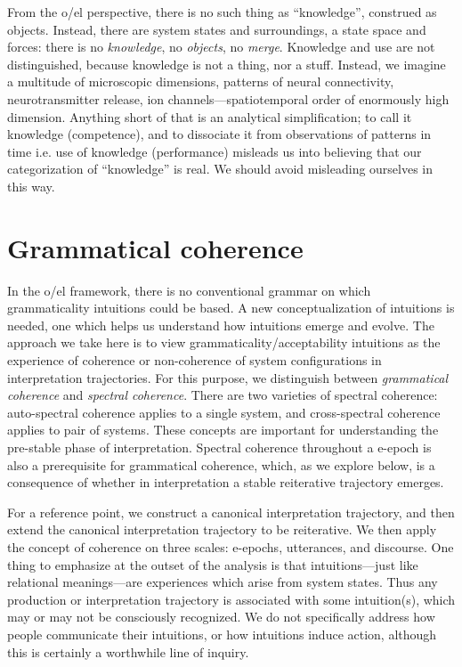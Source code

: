   From the o/el perspective, there is no such thing as “knowledge”, construed as objects. Instead, there are system states and surroundings, a state space and forces: there is no \textit{knowledge}, no \textit{objects}, no \textit{merge}. Knowledge and use are not distinguished, because knowledge is not a thing, nor a stuff. Instead, we imagine a multitude of microscopic dimensions, patterns of neural connectivity, neurotransmitter release, ion channels—spatiotemporal order of enormously high dimension. Anything short of that is an analytical simplification; to call it knowledge (competence), and to dissociate it from observations of patterns in time i.e. use of knowledge (performance) misleads us into believing that our categorization of “knowledge” is real. We should avoid misleading ourselves in this way.

\section{Grammatical coherence}

In the o/el framework, there is no conventional grammar on which grammaticality intuitions could be based. A new conceptualization of intuitions is needed, one which helps us understand how intuitions emerge and evolve. The approach we take here is to view grammaticality/acceptability intuitions as the experience of coherence or non-coherence of system configurations in interpretation trajectories. For this purpose, we distinguish between \textit{grammatical coherence} and \textit{spectral coherence}. There are two varieties of spectral coherence: auto-spectral coherence applies to a single system, and cross-spectral coherence applies to pair of systems. These concepts are important for understanding the pre-stable phase of interpretation. Spectral coherence throughout a e-epoch is also a prerequisite for grammatical coherence, which, as we explore below, is a consequence of whether in interpretation a stable reiterative trajectory emerges.

For a reference point, we construct a canonical interpretation trajectory, and then extend the canonical interpretation trajectory to be reiterative. We then apply the concept of coherence on three scales: e-epochs, utterances, and discourse. One thing to emphasize at the outset of the analysis is that intuitions—just like relational meanings—are experiences which arise from system states. Thus any production or interpretation trajectory is associated with some intuition(s), which may or may not be consciously recognized. We do not specifically address how people communicate their intuitions, or how intuitions induce action, although this is certainly a worthwhile line of inquiry.

